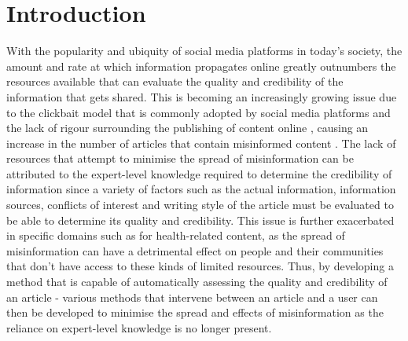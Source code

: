\documentclass[a4paper,twoside,phd]{BYUPhys}
\begin{document}
 \frontmatter


 \makepreliminarypages


\doublespace
%

%

 \clearemptydoublepage
\singlespace
 \tableofcontents

\clearemptydoublepage
\listoffigures

\clearemptydoublepage
\listoftables

\clearemptydoublepage

\mainmatter
%
\chapter{Introduction}
\label{chap:Introduction}

With the popularity and ubiquity of social media platforms in today's society, the amount and rate at which information propagates online greatly outnumbers the resources available that can evaluate the quality and credibility of the information that gets shared. This is becoming an increasingly growing issue due to the clickbait model that is commonly adopted by social media platforms and the lack of rigour surrounding the publishing of content online \cite{Sommariva2018}, causing an increase in the number of articles that contain misinformed content \cite{germanFN} \cite{Vosoughi}. The lack of resources that attempt to minimise the spread of misinformation can be attributed to the expert-level knowledge required to determine the credibility of information since a variety of factors such as the actual information, information sources, conflicts of interest and writing style of the article must be evaluated to be able to determine its quality and credibility. This issue is further exacerbated in specific domains such as for health-related content, as the spread of misinformation can have a detrimental effect on people and their communities that don't have access to these kinds of limited resources. Thus, by developing a method that is capable of automatically assessing the quality and credibility of an article - various methods that intervene between an article and a user can then be developed to minimise the spread and effects of misinformation as the reliance on expert-level knowledge is no longer present.
\end{document}
